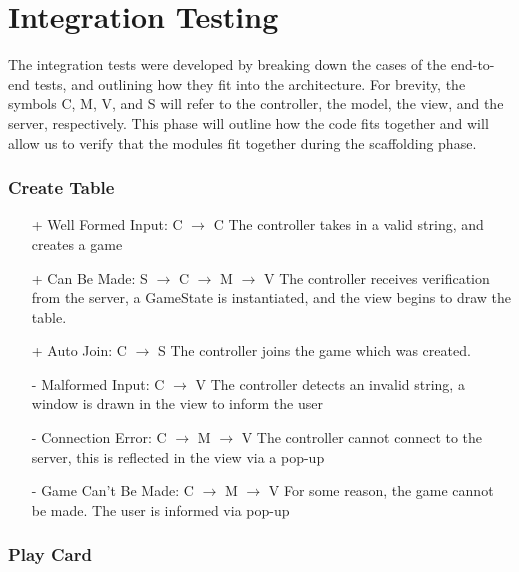 \documentclass[12pt]{article}
\begin{document}
\newpage
\part{Integration Testing}
\setcounter{section}{0}
The integration tests were developed by breaking down the cases of the end-to-end tests, and
outlining how they fit into the architecture.  For brevity, the symbols C, M, V, and S will
refer to the controller, the model, the view, and the server, respectively.  This phase will
outline how the code fits together and will allow us to verify that the modules fit together
during the scaffolding phase.





\section{Create Table}

\begin{itemize}

\item[+] Well Formed Input: C $\rightarrow$ C \newline
The controller takes in a valid string, and creates a game
\item[+] Can Be Made: S $\rightarrow$ C $\rightarrow$ M $\rightarrow$ V \newline
The controller receives verification from the server, a GameState is instantiated,
and the view begins to draw the table.
\item[+] Auto Join: C $\rightarrow$ S \newline
The controller joins the game which was created.

\item[-] Malformed Input: C $\rightarrow$ V \newline
The controller detects an invalid string, a window is drawn in the view to inform the user
\item[-] Connection Error: C $\rightarrow$ M $\rightarrow$ V \newline
The controller cannot connect to the server, this is reflected in the view via a pop-up
\item[-] Game Can't Be Made: C $\rightarrow$ M $\rightarrow$ V \newline
For some reason, the game cannot be made.  The user is informed via pop-up

\end{itemize}

\section{Play Card}
\end{document}
